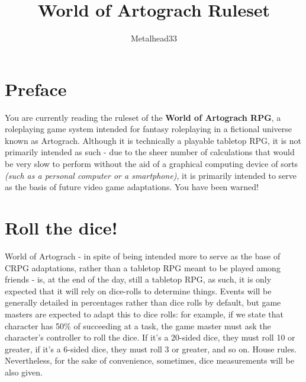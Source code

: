 \documentclass[tikz,openany,11pt,a4paper]{book}
\author{Metalhead33}
\title{World of Artograch Ruleset}
\begin{document}
\maketitle
\tableofcontents
\chapter*{Preface}
You are currently reading the ruleset of the \textbf{World of Artograch RPG}, a roleplaying game system intended for fantasy roleplaying in a fictional universe known as Artograch. Although it is technically a playable tabletop RPG, it is not primarily intended as such - due to the sheer number of calculations that would be very slow to perform without the aid of a graphical computing device of sorts \textit{(such as a personal computer or a smartphone)}, it is primarily intended to serve as the basis of future video game adaptations. You have been warned!\newline
\chapter{Roll the dice!}
World of Artograch - in spite of being intended more to serve as the base of CRPG adaptations, rather than a tabletop RPG meant to be played among friends - is, at the end of the day, still a tabletop RPG, as such, it is only expected that it will rely on dice-rolls to determine things. Events will be generally detailed in percentages rather than dice rolls by default, but game masters are expected to adapt this to dice rolls: for example, if we state that character has 50\% of succeeding at a task, the game master must ask the character's controller to roll the dice. If it's a 20-sided dice, they must roll 10 or greater, if it's a 6-sided dice, they must roll 3 or greater, and so on. House rules. Nevertheless, for the sake of convenience, sometimes, dice measurements will be also given.
\end{document}
